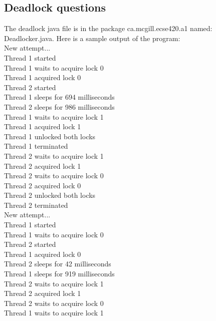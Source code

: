 \documentclass[11pt,letterpaper]{exam}
\begin{document}
\begin{questions}
        \newpage

		\question
		    \section*{Deadlock questions}
			The deadlock java file is in the package ca.mcgill.ecse420.a1 named: Deadlocker.java.
			Here is a sample output of the program:\\
			New attempt...\\
			Thread 1 started\\
			Thread 1 waits to acquire lock 0\\
			Thread 1 acquired lock 0\\
			Thread 2 started\\
			Thread 1 sleeps for 694 milliseconds\\
			Thread 2 sleeps for 986 milliseconds\\
			Thread 1 waits to acquire lock 1\\
			Thread 1 acquired lock 1\\
			Thread 1 unlocked both locks\\
			Thread 1 terminated\\
			Thread 2 waits to acquire lock 1\\
			Thread 2 acquired lock 1\\
			Thread 2 waits to acquire lock 0\\
			Thread 2 acquired lock 0\\
			Thread 2 unlocked both locks\\
			Thread 2 terminated\\
			New attempt...\\
			Thread 1 started\\
			Thread 1 waits to acquire lock 0\\
			Thread 2 started\\
			Thread 1 acquired lock 0\\
			Thread 2 sleeps for 42 milliseconds\\
			Thread 1 sleeps for 919 milliseconds\\
			Thread 2 waits to acquire lock 1\\
			Thread 2 acquired lock 1\\
			Thread 2 waits to acquire lock 0\\
			Thread 1 waits to acquire lock 1\\
			\begin{parts}
				\part

\end{parts}
\end{questions}
\end{document}
